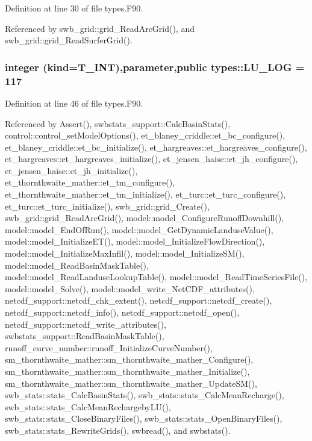 Definition at line 30 of file types.F90.



Referenced by swb\_\-grid::grid\_\-ReadArcGrid(), and swb\_\-grid::grid\_\-ReadSurferGrid().

\hypertarget{namespacetypes_a6b30bc5adf5ad8e9498b0a9081078fe5}{
\subsubsection[{LU\_\-LOG}]{\setlength{\rightskip}{0pt plus 5cm}integer (kind={\bf T\_\-INT}),parameter,public {\bf types::LU\_\-LOG} = 117}}
\label{namespacetypes_a6b30bc5adf5ad8e9498b0a9081078fe5}


Definition at line 46 of file types.F90.



Referenced by Assert(), swbstats\_\-support::CalcBasinStats(), control::control\_\-setModelOptions(), et\_\-blaney\_\-criddle::et\_\-bc\_\-configure(), et\_\-blaney\_\-criddle::et\_\-bc\_\-initialize(), et\_\-hargreaves::et\_\-hargreaves\_\-configure(), et\_\-hargreaves::et\_\-hargreaves\_\-initialize(), et\_\-jensen\_\-haise::et\_\-jh\_\-configure(), et\_\-jensen\_\-haise::et\_\-jh\_\-initialize(), et\_\-thornthwaite\_\-mather::et\_\-tm\_\-configure(), et\_\-thornthwaite\_\-mather::et\_\-tm\_\-initialize(), et\_\-turc::et\_\-turc\_\-configure(), et\_\-turc::et\_\-turc\_\-initialize(), swb\_\-grid::grid\_\-Create(), swb\_\-grid::grid\_\-ReadArcGrid(), model::model\_\-ConfigureRunoffDownhill(), model::model\_\-EndOfRun(), model::model\_\-GetDynamicLanduseValue(), model::model\_\-InitializeET(), model::model\_\-InitializeFlowDirection(), model::model\_\-InitializeMaxInfil(), model::model\_\-InitializeSM(), model::model\_\-ReadBasinMaskTable(), model::model\_\-ReadLanduseLookupTable(), model::model\_\-ReadTimeSeriesFile(), model::model\_\-Solve(), model::model\_\-write\_\-NetCDF\_\-attributes(), netcdf\_\-support::netcdf\_\-chk\_\-extent(), netcdf\_\-support::netcdf\_\-create(), netcdf\_\-support::netcdf\_\-info(), netcdf\_\-support::netcdf\_\-open(), netcdf\_\-support::netcdf\_\-write\_\-attributes(), swbstats\_\-support::ReadBasinMaskTable(), runoff\_\-curve\_\-number::runoff\_\-InitializeCurveNumber(), sm\_\-thornthwaite\_\-mather::sm\_\-thornthwaite\_\-mather\_\-Configure(), sm\_\-thornthwaite\_\-mather::sm\_\-thornthwaite\_\-mather\_\-Initialize(), sm\_\-thornthwaite\_\-mather::sm\_\-thornthwaite\_\-mather\_\-UpdateSM(), swb\_\-stats::stats\_\-CalcBasinStats(), swb\_\-stats::stats\_\-CalcMeanRecharge(), swb\_\-stats::stats\_\-CalcMeanRechargebyLU(), swb\_\-stats::stats\_\-CloseBinaryFiles(), swb\_\-stats::stats\_\-OpenBinaryFiles(), swb\_\-stats::stats\_\-RewriteGrids(), swbread(), and swbstats().

